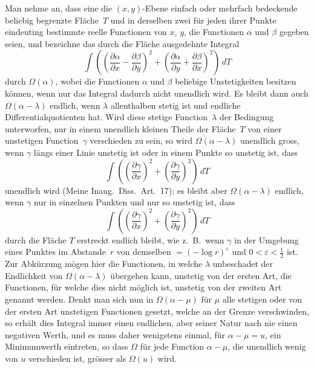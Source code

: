 \documentclass[a4paper,12pt,leqno]{article}
\begin{document}
Man nehme an, dass eine die $(x,y)$-Ebene einfach oder mehrfach
bedeckende beliebig begrenzte Fl\"{a}che~$T$ und in derselben
zwei f\"{u}r jeden ihrer Punkte eindeuting bestimmte reelle
Functionen von $x$, $y$, die Functionen $\alpha$ und $\beta$
gegeben seien, und bezeichne das durch die Fl\"{a}che ausgedehnte
Integral
\[ \int  \left(
            \left(
               \frac{\partial \alpha}{\partial x}
             - \frac{\partial \beta}{\partial y}
            \right)^2
          + \left(
               \frac{\partial \alpha}{\partial y}
             + \frac{\partial \beta}{\partial x}
            \right)^2
         \right) \, dT \]
durch $\Omega(\alpha)$, wobei die Functionen $\alpha$ und $\beta$
beliebige Unstetigkeiten besitzen k\"{o}nnen, wenn nur das
Integral dadurch nicht unendlich wird.  Es bleibt dann auch
$\Omega (\alpha - \lambda)$ endlich, wenn $\lambda$ allenthalben
stetig ist und endliche Differentialquotienten hat.  Wird diese
stetige Function~$\lambda$ der Bedingung unterworfen, nur in
einem unendlich kleinen Theile der Fl\"{a}che~$T$ von einer
unstetigen Function~$\gamma$ verschieden zu sein, so wird
$\Omega (\alpha - \lambda)$ unendlich gross, wenn $\gamma$
l\"{a}ngs einer Linie unstetig ist oder in einem Punkte so
unstetig ist, dass
\[ \int  \left(
            \left( \frac{\partial \gamma}{\partial x} \right)^2
          + \left( \frac{\partial \gamma}{\partial y} \right)^2
         \right) \, dT \]
unendlich wird (Meine Inaug.\ Diss.\ Art.\ 17); es bleibt aber
$\Omega (\alpha - \lambda)$ endlich, wenn $\gamma$ nur in
einzelnen Punkten und nur so unstetig ist, dass
\[ \int  \left(
            \left( \frac{\partial \gamma}{\partial x} \right)^2
          + \left( \frac{\partial \gamma}{\partial y} \right)^2
         \right) \, dT \]
durch die Fl\"{a}che $T$ erstreckt endlich bleibt, wie
z.~B.\ wenn $\gamma$ in der Umgebung eines Punktes im
Abstande~$r$ von demselben $= (- \log r)^\varepsilon$ und
$0 < \varepsilon < \frac{1}{2}$ ist.  Zur Abk\"{u}rzung m\"{o}gen
hier die Functionen, in welche $\lambda$ unbeschadet der
Endlichkeit von $\Omega (\alpha - \lambda)$ \"{u}bergehen kann,
unstetig von der ersten Art, die Functionen, f\"{u}r welche dies
nicht m\"{o}glich ist, unstetig von der zweiten Art genannt
werden.  Denkt man sich nun in $\Omega (\alpha - \mu)$ f\"{u}r
$\mu$ alle stetigen oder von der ersten Art unstetigen Functionen
gesetzt, welche an der Grenze verschwinden, so erh\"{a}lt dies
Integral immer einen endlichen, aber seiner Natur nach nie einen
negativen Werth, und es muss daher wenigstens einmal, f\"{u}r
$\alpha - \mu = u$, ein Minimumwerth eintreten, so dass $\Omega$
f\"{u}r jede Function $\alpha - \mu$, die unendlich wenig von $u$
verschieden ist, gr\"{o}sser als $\Omega(u)$ wird.
\end{document}
